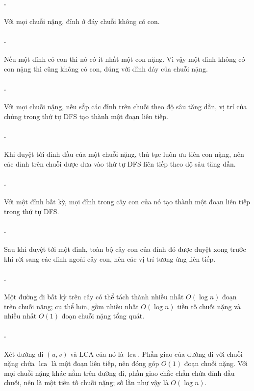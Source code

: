 \documentclass[11pt]{article}
\begin{document}
\paragraph{.}
Với mọi chuỗi nặng, đỉnh ở đáy chuỗi không có con.

\paragraph{.}
Nếu một đỉnh có con thì nó có ít nhất một con nặng. Vì vậy một đỉnh không có
con nặng thì cũng không có con, đúng với đỉnh đáy của chuỗi nặng.

\paragraph{.}
Với mọi chuỗi nặng, nếu sắp các đỉnh trên chuỗi theo độ sâu tăng dần, vị trí
của chúng trong thứ tự DFS tạo thành một đoạn liên tiếp.

\paragraph{.}
Khi duyệt tới đỉnh đầu của một chuỗi nặng, thủ tục luôn ưu tiên con nặng, nên
các đỉnh trên chuỗi được đưa vào thứ tự DFS liên tiếp theo độ sâu tăng dần.

\paragraph{.}
Với một đỉnh bất kỳ, mọi đỉnh trong cây con của nó tạo thành một đoạn liên
tiếp trong thứ tự DFS.

\paragraph{.}
Sau khi duyệt tới một đỉnh, toàn bộ cây con của đỉnh đó được duyệt xong trước
khi rời sang các đỉnh ngoài cây con, nên các vị trí tương ứng liên tiếp.

\paragraph{.}
Một đường đi bất kỳ trên cây có thể tách thành nhiều nhất \(O(\log n)\) đoạn
trên chuỗi nặng; cụ thể hơn, gồm nhiều nhất \(O(\log n)\) tiền tố chuỗi nặng
và nhiều nhất \(O(1)\) đoạn chuỗi nặng tổng quát.

\paragraph{.}
Xét đường đi \((u,v)\) và LCA của nó là \(\operatorname{lca}\). Phần giao của
đường đi với chuỗi nặng chứa \(\operatorname{lca}\) là một đoạn liên tiếp, nên
đóng góp \(O(1)\) đoạn chuỗi nặng. Với mọi chuỗi nặng khác nằm trên đường đi,
phần giao chắc chắn chứa đỉnh đầu chuỗi, nên là một tiền tố chuỗi nặng; số lần
như vậy là \(O(\log n)\).
\end{document}
